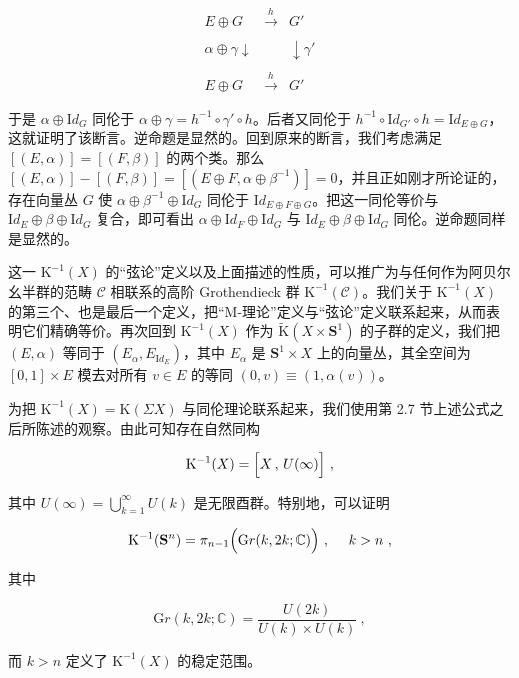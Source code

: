 \documentclass[11pt,a4paper]{ctexart}
\begin{document}
\[{\begin{array}{ccc}
E\oplus G&\stackrel{h}{\longrightarrow}&G'\\&
&\\{\scriptstyle\alpha\oplus\gamma}\downarrow& &
\downarrow{\scriptstyle\gamma'}\\&
&\\E\oplus G&\stackrel{h}{\longrightarrow}&G'\end{array}}\]

于是 \(\alpha\oplus {\mathrm Id}_G\) 同伦于 \(\alpha\oplus\gamma=h^{-1}\circ\gamma'\circ h\)。后者又同伦于 \(h^{-1}\circ{\mathrm Id}_{G'}\circ h={\mathrm Id}_{E\oplus G}\)，这就证明了该断言。逆命题是显然的。回到原来的断言，我们考虑满足 \([(E,\alpha)]=[(F,\beta)]\) 的两个类。那么 \([(E,\alpha)]-[(F,\beta)]=[(E\oplus F,\alpha\oplus\beta^{-1})]=0\)，并且正如刚才所论证的，存在向量丛 \(G\) 使 \(\alpha\oplus\beta^{-1}\oplus {\mathrm Id}_G\) 同伦于 \({\mathrm Id}_{E\oplus F\oplus G}\)。把这一同伦等价与 \({\mathrm Id}_E\oplus\beta\oplus{\mathrm Id}_G\) 复合，即可看出 \(\alpha\oplus{\mathrm Id}_F\oplus{\mathrm Id}_G\) 与 \({\mathrm Id}_E\oplus\beta\oplus{\mathrm Id}_G\) 同伦。逆命题同样是显然的。

这一 \({\mathrm K}^{-1}(X)\) 的``弦论''定义以及上面描述的性质，可以推广为与任何作为阿贝尔幺半群的范畴 \({\mathcal C}\) 相联系的高阶 Grothendieck 群 \({\mathrm K}^{-1}({\mathcal C})\)。我们关于 \({\mathrm K}^{-1}(X)\) 的第三个、也是最后一个定义，把``M-理论''定义与``弦论''定义联系起来，从而表明它们精确等价。再次回到 \({\mathrm K}^{-1}(X)\) 作为 \(\widetilde{{\mathrm K}}(X\times{\mathbf S}^1)\) 的子群的定义，我们把 \((E,\alpha)\) 等同于 \((E_{\alpha},E_{{\mathrm Id}_{E}})\)，其中 \(E_{\alpha}\) 是 \({\mathbf S}^1\times X\) 上的向量丛，其全空间为 \([0,1]\times E\) 模去对所有 \(v\in E\) 的等同 \((0,v)\equiv(1,\alpha(v))\)。

为把 \({\mathrm K}^{-1}(X)={\mathrm K}(\Sigma X)\) 与同伦理论联系起来，我们使用第 2.7 节上述公式之后所陈述的观察。由此可知存在自然同构

\[{\mathrm K}^{-1}(X)=\Bigl[X\,,\,U(\infty)\Bigr]\ ,\]

其中 \(U(\infty)=\bigcup_{k=1}^{\infty}U(k)\) 是无限酉群。特别地，可以证明

\[{\mathrm K}^{-1}({\mathbf S}^n)= \pi_{n-1}\Bigl({\mathrm Gr}(k,2k;{\mathbb{C}})
\Bigr)\ , \ \ \ \ k>n\ ,\]

其中

\[{\mathrm Gr}(k,2k;{\mathbb{C}})=\frac{U(2k)}{U(k)\times U(k)}\ ,\]

而 \(k>n\) 定义了 \({\mathrm K}^{-1}(X)\) 的稳定范围。
\end{document}
